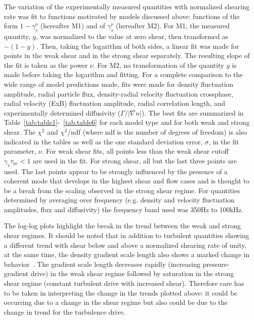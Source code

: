 \documentclass[aip,pop,amsmath,amssymb,preprint,superscriptaddress]{revtex4-1} %
\begin{document}
The variation of the experimentally measured quantities with normalized shearing rate was fit to functions motivated by models discussed above: functions of the form $1-\gamma_{s}^{\nu}$ (hereafter M1) and of $\gamma_{s}^{\nu}$ (hereafter M2). For M1, the measured quantity, $y$, was normalized to the value at zero shear, then transformed as $-(1-y)$. Then, taking the logarithm of both sides, a linear fit was made for points in the weak shear and in the strong shear separately. The resulting slope of the fit is taken as the power $\nu$. For M2, no transformation of the quantity $y$ is made before taking the logarithm and fitting. For a complete comparison to the wide range of model predictions made, fits were made for density fluctuation amplitude, radial particle flux, density-radial velocity fluctuation crossphase, radial velocity (ExB) fluctuation amplitude, radial correlation length, and experimentally determined diffusivity ($\Gamma/|\nabla n|$). The best fits are summarized in Table~\ref{tab:table1}-~\ref{tab:table6} for each model type and for both weak and strong shear. The $\chi^{2}$ and $\chi^{2}/$ndf (where ndf is the number of degrees of freedom) is also indicated in the tables as well as the one standard deviation error, $\sigma$, in the fit parameter, $\nu$.  For weak shear fits, all points less than the weak shear cutoff $\gamma_{s}\tau_{ac}<1$ are used in the fit. For strong shear, all but the last three points are used. The last points appear to be strongly influenced by the presence of a coherent mode that develops in the highest shear and flow cases and is thought to be a break from the scaling observed in the strong shear regime. For quantities determined by averaging over frequency (e.g. density and velocity fluctuation amplitudes, flux and diffusivity) the frequency band used was 350Hz to 100kHz.

The log-log plots highlight the break in the trend between the weak and
strong shear regimes. It should be noted that in addition to turbulent
quantities showing a different trend with shear below and above a
normalized shearing rate of unity, at the same time, the density
gradient scale length also shows a marked change in
behavior~\cite{schaffner12}.  The gradient scale length decreases
rapidly (increasing pressure-gradient drive) in the weak shear
regime followed by saturation in the strong shear regime (constant
turbulent drive with increased shear). Therefore care has to be taken in interpreting the change in the trends plotted above: it could be occurring due to a change in the shear regime but also could be due to the change in trend for the turbulence drive.
\end{document}
